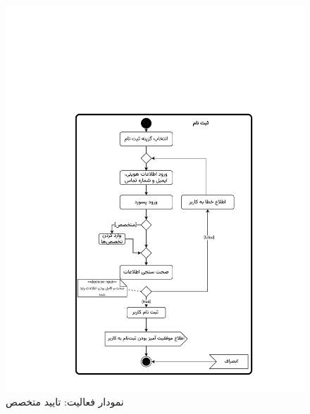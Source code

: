 \begin{figure}[ht!]
	\centering
	\includegraphics[scale=0.8, page=6]{figs/OOD-activity1-10.pdf}
	\caption{نمودار فعالیت: تایید متخصص}
\end{figure}
\FloatBarrier
\newpage

